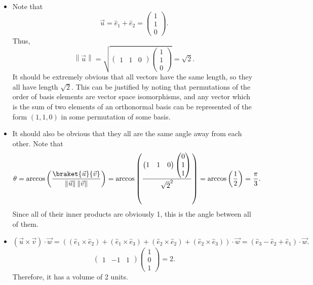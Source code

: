 \documentclass[11pt, letterpaper]{article}
\begin{document}
\begin{itemize}
	\item Note that
		\[
			\vec{u} =\hat{e}_1 + \hat{e} _2 = \begin{pmatrix}
			1 \\
			1 \\
			0
			\end{pmatrix}
		.\]
		Thus,
		\[
			\left\| \vec{u}  \right\| =\sqrt{\begin{pmatrix}
			1 & 1 & 0
			\end{pmatrix}\begin{pmatrix}
			1 \\
			1 \\
			0
			\end{pmatrix}} =\sqrt{2} 
		.\]
		It should be extremely obvious that all vectors have the same length, so they all have length $\sqrt{2} $. This can be justified by noting that permutations of the order of basis elements are vector space isomorphisms, and any vector which is the sum of two elements of an orthonormal basis can be represented of the form $(1,1,0)$ in some permutation of some basis.
	\item It should also be obvious that they all are the same angle away from each other. Note that
		\[
			\theta =\arccos \left( \frac{\braket{\vec{u} }{\vec{v}}  }{\left\| \vec{u}  \right\| \left\| \vec{v}  \right\| }  \right) =\arccos \left( \frac{\begin{pmatrix}
			1 & 1 & 0
			\end{pmatrix}\begin{pmatrix}
			0 \\
			1 \\
			1
			\end{pmatrix}}{\sqrt{2} ^2}  \right) =\arccos \left( \frac{1}{2}  \right) =\frac{\pi }{3} 
		.\]
		Since all of their inner products are obviously 1, this is the angle between all of them.
	\item 
		\[
			\left( \vec{u} \times \vec{v}  \right) \cdot \vec{w} =\left( \left( \hat{e} _1 \times \hat{e} _2 \right) +\left( \hat{e} _1 \times \hat{e} _3 \right) +\left( \hat{e} _2 \times \hat{e} _2 \right) +\left( \hat{e} _2 \times \hat{e} _3 \right)  \right) \cdot \vec{w} =\left( \hat{e}_3 - \hat{e}_2 + \hat{e}_1 \right) \cdot \vec{w} 
		.\]
		\[
			\begin{pmatrix}
			1 & -1 & 1
			\end{pmatrix}\begin{pmatrix}
			1 \\
			0 \\
			1
			\end{pmatrix}=2
		.\]
		Therefore, it has a volume of 2 units.
\end{itemize}
\end{document}
